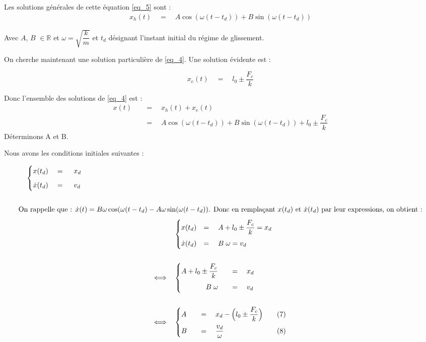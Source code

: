 \documentclass{article}
\begin{document}
Les solutions générales de cette équation \eqref{eq_5} sont :
%
\begin{align*}
x_h(t) \quad=\quad A\cos(\omega (t-t_d))+B\sin( \omega (t-t_d)) 
\end{align*}

Avec $A$, $B$ $\in \mathbb{R}$ et $\omega = \sqrt{\dfrac{k}{m}}$ et $t_d$ désignant l'instant initial du régime de glissement.  

On cherche maintenant une solution particulière de \eqref{eq_4}. Une solution évidente est : 

$$x_e(t)\quad =\quad l_0 \pm \dfrac{F_c}{k}$$

Donc l'ensemble des solutions de \eqref{eq_4} est :
\begin{align}
	x(t)& \quad=\quad x_h(t)+x_e(t)\nonumber\\
	&\quad=\quad A\cos(\omega (t-t_d))+B\sin (\omega (t-t_d)) +l_0 \pm \dfrac{F_c}{k} \label{eq_6}
\end{align}
Déterminons A et B.

Nous avons les conditions initiales suivantes : 

\begin{align*}
&\quad\begin{cases}
\vspace{.2cm}
	x(t_d)& \;=\; \quad x_d\\
	\dot{x}(t_d) & \;=\; \quad v_d 
\end{cases}
\\\\
\intertext{On rappelle que : 
$\dot{x}(t)=B\omega\cos(\omega (t-t_d) - A\omega \sin(\omega (t-t_d))$.
Donc en remplaçant $x(t_d)$ et $\dot x(t_d)$ par leur expressions, on obtient :}
\end{align*}
\begin{align*}
&\quad
\begin{cases}
\vspace{.2cm}
x(t_d) &= \quad A + l_0 \pm \dfrac{F_c}{k} = x_d \\
\dot{x}(t_d) &= \quad B\; \omega = v_d  
\end{cases}	\\\\
\Longleftrightarrow
&\quad
\begin{cases}
\vspace{.2cm}
A + l_0 \pm \dfrac{F_c}{k} \quad &= \quad x_d  \\
\hfill B\;\omega \quad &= \quad v_d 
\end{cases}	\\\\
\Longleftrightarrow
&\quad
\begin{cases}
\vspace{0.2cm}
	A \quad &= \quad x_d- \Big{(}l_0 \pm \dfrac{F_c}{k}\Big{)} \qquad(7)\\
	B  \quad &= \quad \dfrac{v_d}{\omega} \qquad \hfill(8)
\end{cases}	
\end{align*}
\end{document}
